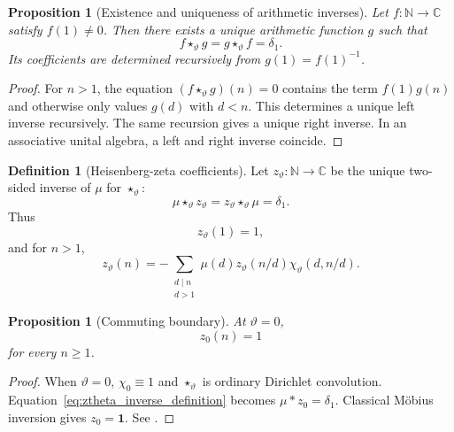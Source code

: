 \documentclass[11pt]{amsart}
\numberwithin{equation}{section}
\theoremstyle{plain}
\newtheorem{proposition}[theorem]{Proposition}
\theoremstyle{definition}
\newtheorem{definition}[theorem]{Definition}
\theoremstyle{remark}
\newcommand{\C}{\mathbb{C}}
\newcommand{\N}{\mathbb{N}}
\newcommand{\twconv}{\star_{\vartheta}}
\newcommand{\deltaone}{\delta_{1}}
\begin{document}
\begin{proposition}[Existence and uniqueness of arithmetic inverses]
\label{prop:formal_inverse}
Let $f:\N\to\C$ satisfy $f(1)\neq0$.  Then there exists a unique arithmetic
function $g$ such that
\begin{equation}
f\twconv g=g\twconv f=\deltaone.
\label{eq:two_sided_inverse}
\end{equation}
Its coefficients are determined recursively from $g(1)=f(1)^{-1}$.
\end{proposition}

\begin{proof}
For $n>1$, the equation $(f\twconv g)(n)=0$ contains the term $f(1)g(n)$
and otherwise only values $g(d)$ with $d<n$.  This determines a unique left
inverse recursively.  The same recursion gives a unique right inverse.  In
an associative unital algebra, a left and right inverse coincide.
\end{proof}

\begin{definition}[Heisenberg-zeta coefficients]
\label{def:heisenberg_zeta_coefficients}
Let $z_{\vartheta}:\N\to\C$ be the unique two-sided inverse of $\mu$ for
$\twconv$:
\begin{equation}
\mu\twconv z_{\vartheta}
=
z_{\vartheta}\twconv\mu
=
\deltaone.
\label{eq:ztheta_inverse_definition}
\end{equation}
Thus
\begin{equation}
z_{\vartheta}(1)=1,
\label{eq:ztheta_one}
\end{equation}
and for $n>1$,
\begin{equation}
z_{\vartheta}(n)
=
-\sum_{\substack{d\mid n\\d>1}}
\mu(d)z_{\vartheta}(n/d)
\chi_{\vartheta}(d,n/d).
\label{eq:ztheta_recursion}
\end{equation}
\end{definition}

\begin{proposition}[Commuting boundary]
\label{prop:commuting_boundary}
At $\vartheta=0$,
\begin{equation}
z_0(n)=1
\label{eq:z0_constant_one}
\end{equation}
for every $n\ge1$.
\end{proposition}

\begin{proof}
When $\vartheta=0$, $\chi_0\equiv1$ and $\twconv$ is ordinary Dirichlet
convolution.  Equation~\eqref{eq:ztheta_inverse_definition} becomes
$\mu*z_0=\deltaone$.  Classical M\"obius inversion gives $z_0=\mathbf1$.
See \cite{Apostol1976}.
\end{proof}
\end{document}
